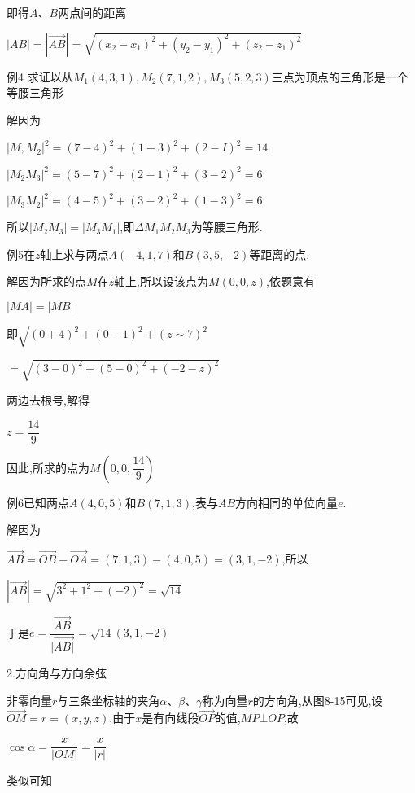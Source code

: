 \documentclass[oneside]{book}
\begin{document}
即得$A$、$B$两点间的距离

$|AB| = |\overrightarrow {AB} | = \sqrt {{{({x_2} - {x_1})}^2} + {{({y_2} - {y_1})}^2} + {{({z_2} - {z_1})}^2}} $

例4 求证以从${M_1}(4,3,1),{{{M}}_2}(7{{,}}1{{,}}2){{,}}{{{M}}_3}(5,2,3)$三点为顶点的三角形是一个等腰三角形

解因为

$\left|M, M_{2}\right|^{2}=(7-4)^{2}+(1-3)^{2}+(2-I)^{2}=14$

$\left|M_{2} M_{3}\right|^{2}=(5-7)^{2}+(2-1)^{2}+(3-2)^{2}=6$

$\left|M_{3} M_{2}\right|^{2}=(4-5)^{2}+(3-2)^{2}+(1-3)^{2}=6$

所以$\left| {{M_2}{M_3}} \right| = \left| {{M_3}{M_1}} \right|$,即$\Delta {M_1}{M_2}{M_3}$为等腰三角形.

例5在$z$轴上求与两点$A( - 4,1,7)$和$B\left( {3,5, - 2} \right)$等距离的点.

解因为所求的点$M$在$z$轴上,所以设该点为$M(0,0,z)$,依题意有

$|MA| = \left| {MB} \right|$

即$\sqrt{(0+4)^{2}+(0-1)^{2}+(z \sim 7)^{2}}$

\quad $=\sqrt{(3-0)^{2}+(5-0)^{2}+(-2-z)^{2}}$

两边去根号,解得

$z = \dfrac{{14}}{9}$

因此,所求的点为$M(0,0,\dfrac{{14}}{9})$

例6已知两点$A\left( {4,0,5} \right)$和$B\left( {7,1,3} \right)$,表与$AB$方向相同的单位向量$e$.

解因为

$\overrightarrow {AB}  = \overrightarrow {OB}  - \overrightarrow {OA}  = \left( {7,1,3} \right) - \left( {4,0,5} \right) = \left( {3,1, - 2} \right)$,所以

$\left| {\overrightarrow {AB} } \right| = \sqrt {{3^2} + {1^2} + {{\left( { - 2} \right)}^2}}  = \sqrt {14} $

于是$e = \dfrac{{\overrightarrow {AB} }}{{|\overrightarrow {AB|} }} = \sqrt {14} (3,1, - 2)$

2.方向角与方向余弦

非零向量$r$与三条坐标轴的夹角$\alpha $、$\beta $、$\gamma $称为向量$r$的方向角,从图8-15可见,设$\overrightarrow {OM}  = r = (x,y,z)$,由于$x$是有向线段$\overrightarrow {OP} $的值,$MP \bot OP$,故

$\cos\alpha  = \dfrac{x}{{|OM|}} = \dfrac{x}{{|r|}}$

类似可知
\end{document}
